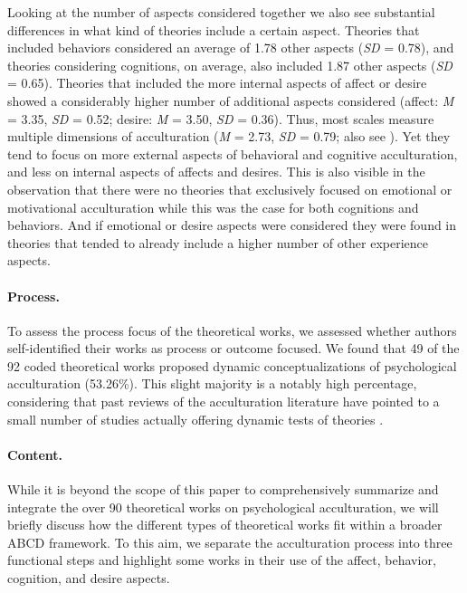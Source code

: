 Looking at the number of aspects considered together we also see
substantial differences in what kind of theories include a certain
aspect. Theories that included behaviors considered an average of 1.78
other aspects (\textit{SD} = 0.78), and theories considering cognitions,
on average, also included 1.87 other aspects (\textit{SD} = 0.65).
Theories that included the more internal aspects of affect or desire
showed a considerably higher number of additional aspects considered
(affect: \textit{M} = 3.35, \textit{SD} = 0.52; desire: \textit{M} =
3.50, \textit{SD} = 0.36). Thus, most scales measure multiple dimensions
of acculturation (\textit{M} = 2.73, \textit{SD} = 0.79; also see
). Yet they tend to focus on more
external aspects of behavioral and cognitive acculturation, and less on
internal aspects of affects and desires. This is also visible in the
observation that there were no theories that exclusively focused on
emotional or motivational acculturation while this was the case for both
cognitions and behaviors. And if emotional or desire aspects were
considered they were found in theories that tended to already include a
higher number of other experience aspects.

\color{blue}
\paragraph{Process.}

To assess the process focus of the theoretical works, we assessed
whether authors self-identified their works as process or outcome
focused. We found that 49 of the 92 coded theoretical works proposed
dynamic conceptualizations of psychological acculturation (53.26\%).
This slight majority is a notably high percentage, considering that past
reviews of the acculturation literature have pointed to a small number
of studies actually offering dynamic tests of theories
\citep[e.g.,][]{Brown2011, Ward2019}.

\paragraph{Content.}

While it is beyond the scope of this paper to comprehensively summarize
and integrate the over 90 theoretical works on psychological
acculturation, we will briefly discuss how the different types of
theoretical works fit within a broader ABCD framework. To this aim, we
separate the acculturation process into three functional steps and
highlight some works in their use of the affect, behavior, cognition,
and desire aspects.

